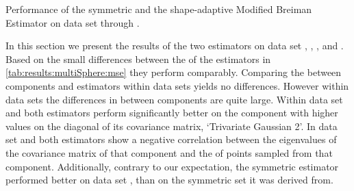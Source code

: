 \begin{table}
	\centering
	
	\caption{Performance of the symmetric and the shape-adaptive Modified Breiman Estimator on data set \ferdosiTwo through \baakmanThree.} 	
	\label{tab:results:multiSphere:mse}
\end{table}

In this section we present the results of the two estimators on data set \ferdosiTwo, \baakmanTwo, \ferdosiThree, and \baakmanThree.
	Based on the small differences between the \mses of the estimators in \cref{tab:results:multiSphere:mse} they perform comparably. 
	Comparing the \MSE between components and estimators within data sets yields no differences. However within data sets the differences in \mses between components are quite large.
	Within data set \ferdosiTwo and \baakmanTwo both estimators perform significantly better on the component with higher values on the diagonal of its covariance matrix, \eg `Trivariate Gaussian 2'.
	In data set \ferdosiThree and \baakmanThree both estimators show a negative correlation between the eigenvalues of the covariance matrix of that component and the \MSE of points sampled from that component. Additionally, contrary to our expectation, the symmetric estimator performed better on data set \baakmanThree, than on the symmetric set it was derived from.

